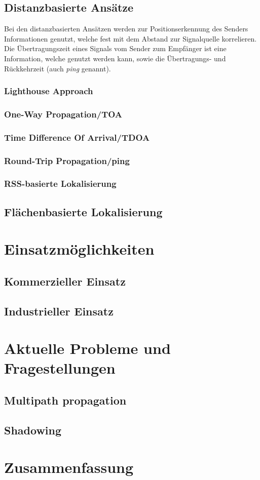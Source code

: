 \documentclass[12pt, a4wide]{scrreprt}
\begin{document}
  \section{Distanzbasierte Ansätze}
Bei den distanzbasierten Ansätzen werden zur Positionserkennung des Senders Informationen genutzt, welche fest mit dem Abstand zur Signalquelle korrelieren. Die Übertragungszeit eines Signals vom Sender zum Empfänger ist eine Information, welche genutzt werden kann, sowie die Übertragungs- und Rückkehrzeit (auch \textit{ping} genannt).
    \subsection{Lighthouse Approach}
    \subsection{One-Way Propagation/TOA}
    \subsection{Time Difference Of Arrival/TDOA}
    \subsection{Round-Trip Propagation/ping}
    \subsection{RSS-basierte Lokalisierung}    
  \section{Flächenbasierte Lokalisierung}
\chapter{Einsatzmöglichkeiten}
  \section{Kommerzieller Einsatz}
  \section{Industrieller Einsatz}

\chapter{Aktuelle Probleme und Fragestellungen}
  \section{Multipath propagation}
  \section{Shadowing}

\chapter{Zusammenfassung}

\newpage
%


\begin{multicols}{2}

\nocite{*}
\end{multicols}
\end{document}
